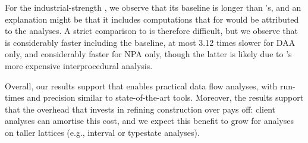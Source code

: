 For the industrial-strength , we observe that its baseline is longer than {\intraj}'s, and an explanation might be that it includes computations that for {\intraj} would be attributed to the analyses.
A strict comparison to  is therefore difficult, but we observe that {\intraj} is considerably faster including the baseline, at most 3.12 times slower for DAA only, and considerably faster for NPA only, though the latter is likely due to 's more expensive interprocedural analysis.

Overall, our results support that {\intraj} enables practical data flow analyses, with run-times and precision similar to state-of-the-art tools.
Moreover, the results support that the overhead that {\intraj} invests in refining {\CFG} construction over {\jastaddjintraflow}
pays off: client analyses can amortise this cost,
and we expect this benefit to grow for analyses on taller lattices (e.g., interval or typestate analyses).


